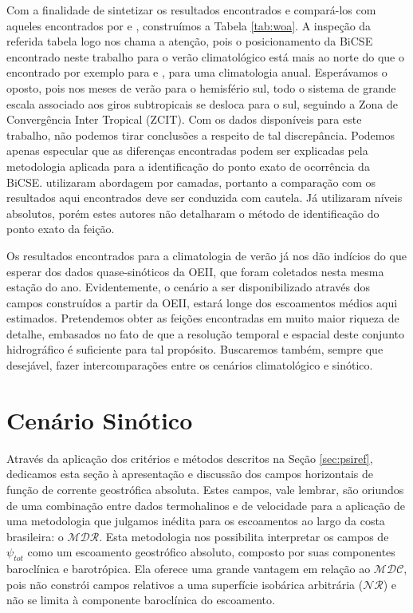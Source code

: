 Com a finalidade de sintetizar os resultados encontrados e compará-los com aqueles encontrados por 
\cite{stramma_england1999} e \cite{rodrigues_etal2006}, construímos a Tabela \ref{tab:woa}.
A inspeção da referida tabela logo nos chama a atenção, pois o posicionamento da BiCSE encontrado 
neste trabalho para o verão climatológico está mais ao norte do que o encontrado por exemplo para 
\cite{stramma_england1999} e \cite{rodrigues_etal2006}, para uma climatologia anual. Esperávamos
o oposto, pois nos meses de verão para o hemisfério sul, todo o sistema de grande escala associado 
aos giros subtropicais se desloca para o sul, seguindo a Zona de Convergência Inter Tropical (ZCIT). 
Com os dados disponíveis para este trabalho, não podemos tirar conclusões a respeito de tal discrepância. 
Podemos apenas especular que as diferenças encontradas podem ser explicadas pela metodologia aplicada
para a identificação do ponto exato de ocorrência da BiCSE. \cite{stramma_england1999} utilizaram
abordagem por camadas, portanto a comparação com os resultados aqui encontrados deve ser conduzida
com cautela. Já \cite{rodrigues_etal2006} utilizaram níveis absolutos, porém estes autores não 
detalharam o método de identificação do ponto exato da feição. 

Os resultados encontrados para a climatologia de verão já nos dão indícios do que esperar dos
dados quase-sinóticos da OEII, que foram coletados nesta mesma estação do ano. Evidentemente, o cenário
a ser disponibilizado através dos campos construídos a partir da OEII, estará longe dos escoamentos
médios aqui estimados. Pretendemos obter  as feições encontradas em muito maior riqueza de detalhe, 
embasados no fato de que a resolução temporal e espacial deste conjunto hidrográfico é suficiente para
tal propósito. Buscaremos também, sempre que desejável, fazer intercomparações entre os cenários 
climatológico e sinótico.


\section{Cenário Sinótico} \label{sec:res_sinotico}

\hspace{6mm} Através da aplicação dos critérios e métodos descritos na Seção \ref{sec:psiref},
 dedicamos esta seção à apresentação e discussão
dos campos horizontais de função de corrente geostrófica absoluta. Estes campos, vale lembrar, são oriundos
de uma combinação entre dados termohalinos e de velocidade para a aplicação de uma metodologia que
julgamos inédita para os escoamentos ao largo da 
costa brasileira: o $\mathcal{MDR}$. Esta metodologia nos possibilita interpretar os campos de $\psi_{tot}$ como
um escoamento geostrófico absoluto, composto por suas componentes baroclínica e barotrópica. Ela oferece
uma grande vantagem em relação ao $\mathcal{MDC}$, pois não constrói campos relativos a uma superfície
isobárica arbitrária ($\mathcal{NR}$) e não se limita à componente baroclínica do escoamento. 

